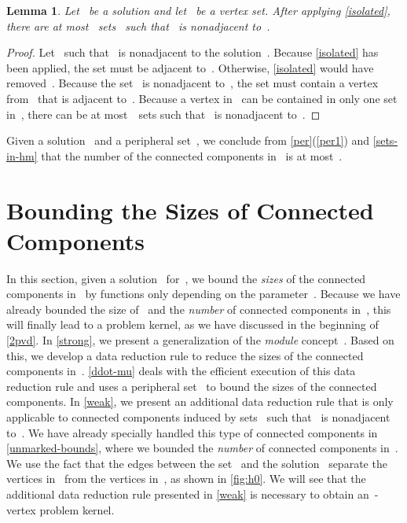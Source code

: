 \documentclass[12pt, a4paper, abstracton]{scrreprt}
\renewcommand{\cite}{~\citep}
\newcounter{theorem}
\newtheorem{lemma}{Lemma}[chapter]
\theoremstyle{definition}
\theoremstyle{remark}
\begin{document}
\begin{lemma}\label{sets-in-hm}
  Let~ be a solution and let~ be a vertex set. After applying \autoref{isolated}, there are at most ~sets~ such that~ is nonadjacent to~.
\end{lemma}

\begin{proof}
  Let~ such that~ is nonadjacent to the solution~. Because \autoref{isolated} has been applied, the set  must be adjacent to~. Otherwise, \autoref{isolated} would have removed~. Because the set~ is nonadjacent to~, the set  must contain a vertex from~ that is adjacent to~. Because a vertex in~ can be contained in only one set in~, there can be at most~~sets  such that~ is nonadjacent to~.
\end{proof}

\noindent Given a solution~ and a peripheral set~, we conclude from \autoref{per}(\ref{per1}) and \autoref{sets-in-hm} that the number of the connected components in~ is at most~.

\section{Bounding the Sizes of Connected Components}
\label{redundant}
In this section, given a solution~ for~, we bound the \emph{sizes} of the connected components in~ by functions only depending on the parameter~. Because we have already bounded the size of~ and the \emph{number} of connected components in~, this will finally lead to a problem kernel, as we have discussed in the beginning of \autoref{2pvd}. In \autoref{strong}, we present a generalization of the \emph{module} concept\cite{Gal67,DBLP:journals/dm/McConnellS99}. Based on this, we develop a data reduction rule to reduce the sizes of the connected components in~. \autoref{ddot-mu} deals with the efficient execution of this data reduction rule and uses a peripheral set~ to bound the sizes of the connected components.  In \autoref{weak}, we present an additional data reduction rule that is only applicable to connected components induced by sets~ such that~ is nonadjacent to~. We have already specially handled this type of connected components in \autoref{unmarked-bounds}, where we bounded the \emph{number} of connected components in~. We use the fact that the edges between the set~ and the solution~ separate the vertices in~ from the vertices in~, as shown in \autoref{fig:h0}. We will see that the additional data reduction rule presented in \autoref{weak} is necessary to obtain an~-vertex problem kernel.
\end{document}
